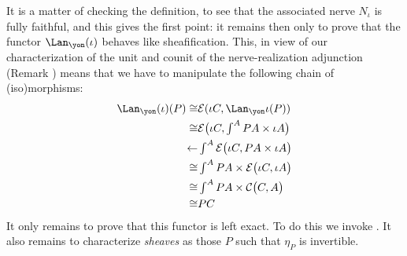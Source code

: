 \begin{example}
It is a matter of checking the definition, to see that the associated nerve $N_\iota$ is fully faithful, and this gives the first point: it remains then only to prove that the functor $\Lan_\yon(\iota)$ behaves like sheafification. This, in view of our characterization of the unit and counit of the nerve\hyp{}realization adjunction (Remark ) means that we have to manipulate the following chain of (iso)morphisms:
\begin{align*}
\Lan_\yon(\iota)(P) \cong & \mathcal E(\iota C, \Lan_\yon\iota(P))\\
\cong &\textstyle \mathcal E\big(\iota C, \int^A PA\times \iota A\big)\\
\leftarrow &\textstyle \int^A \mathcal E\big(\iota C, PA\times \iota A\big)\\
\cong &\textstyle \int^A PA\times \mathcal E\big(\iota C, \iota A\big)\\
\cong &\textstyle \int^A PA\times \mathcal C\big(C,A\big)\\
\cong & PC
\end{align*}
It only remains to prove that this functor is left exact. To do this we invoke \aprop{}. It also remains to characterize \emph{sheaves} as those $P$ such that $\eta_P$ is invertible.%
\end{example}
